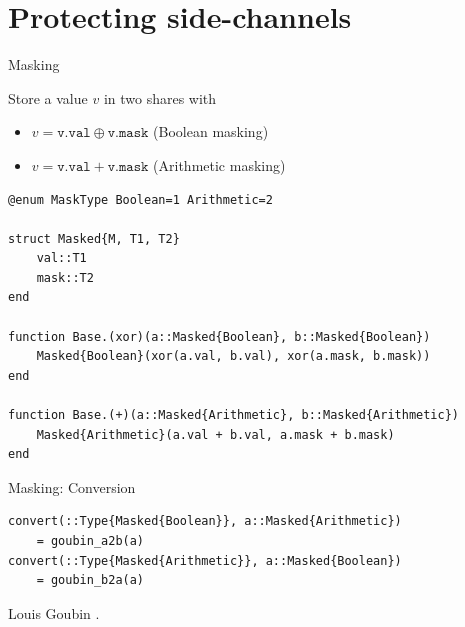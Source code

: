 \section*{Protecting side-channels}

\begin{frame}[fragile]{Masking}

Store a value $v$ in two shares with
\begin{itemize}
    \item $v = \mathtt{v.val} \oplus \mathtt{v.mask}$ \hspace{1em} ({Boolean masking})
    \item $v = \mathtt{v.val} + \mathtt{v.mask}$ \hspace{1em} ({Arithmetic masking})
\end{itemize}

\vspace{1em}

\begin{verbatim}
@enum MaskType Boolean=1 Arithmetic=2

struct Masked{M, T1, T2}
    val::T1
    mask::T2
end

function Base.(xor)(a::Masked{Boolean}, b::Masked{Boolean})
    Masked{Boolean}(xor(a.val, b.val), xor(a.mask, b.mask))
end

function Base.(+)(a::Masked{Arithmetic}, b::Masked{Arithmetic})
    Masked{Arithmetic}(a.val + b.val, a.mask + b.mask)
end

\end{verbatim}
\end{frame}

\begin{frame}[fragile]{Masking: Conversion}

\begin{verbatim}
convert(::Type{Masked{Boolean}}, a::Masked{Arithmetic})
    = goubin_a2b(a)
convert(::Type{Masked{Arithmetic}}, a::Masked{Boolean})
    = goubin_b2a(a)
\end{verbatim}
\vspace{2em}
\begin{thebibliography}{10}
    \beamertemplatebookbibitems
    Louis Goubin
    .
\end{thebibliography}
\end{frame}



